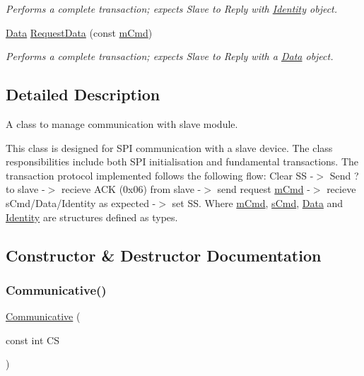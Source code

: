 \begin{DoxyCompactItemize}
\begin{DoxyCompactList}\small\item\em Performs a complete transaction; expects Slave to Reply with \mbox{\hyperlink{struct_identity}{Identity}} object. \end{DoxyCompactList}\item 
\mbox{\hyperlink{struct_data}{Data}} \mbox{\hyperlink{class_communicative_a0a56aaa3248edae66ccb13cbf2bf156a}{Request\+Data}} (const \mbox{\hyperlink{structm_cmd}{m\+Cmd}})
\begin{DoxyCompactList}\small\item\em Performs a complete transaction; expects Slave to Reply with a \mbox{\hyperlink{struct_data}{Data}} object. \end{DoxyCompactList}\end{DoxyCompactItemize}


\subsection{Detailed Description}
A class to manage communication with slave module. 

This class is designed for S\+PI communication with a slave device. The class responsibilities include both S\+PI initialisation and fundamental transactions. The transaction protocol implemented follows the following flow\+: Clear SS -\/$>$ Send \textquotesingle{}?\textquotesingle{} to slave -\/$>$ recieve \textquotesingle{}A\+CK\textquotesingle{} (0x06) from slave -\/$>$ send request \mbox{\hyperlink{structm_cmd}{m\+Cmd}} -\/$>$ recieve s\+Cmd/\+Data/\+Identity as expected -\/$>$ set SS. Where \mbox{\hyperlink{structm_cmd}{m\+Cmd}}, \mbox{\hyperlink{structs_cmd}{s\+Cmd}}, \mbox{\hyperlink{struct_data}{Data}} and \mbox{\hyperlink{struct_identity}{Identity}} are structures defined as types. 

\subsection{Constructor \& Destructor Documentation}
\mbox{\label{class_communicative_aa92e21c2c2b3ee8dda993872f6b0c73a}} 
\subsubsection{\texorpdfstring{Communicative()}{Communicative()}}
{\footnotesize\ttfamily \mbox{\hyperlink{class_communicative}{Communicative}} (\begin{DoxyParamCaption}\item[{const int}]{CS }\end{DoxyParamCaption})}



